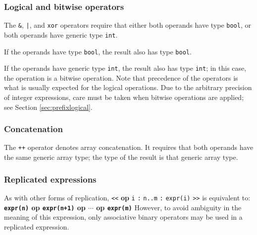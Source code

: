 

\subsubsection{Logical and bitwise operators}\label{sec:logical}

The {\tt{}\&}, \verb'|', and {\tt{}xor} operators require that either both operands
have type {\tt{}bool}, or both operands have generic type {\tt{}int}.

If the operands have type {\tt{}bool}, the result also has type {\tt{}bool}.

If the operands have generic type {\tt{}int}, the result also has
type {\tt{}int}; in this case, the operation is a bitwise operation.
Note that precedence of the operators is what is usually expected for
the logical operations. Due to the arbitrary precision of integer
expressions, care must be taken when bitwise operations are applied;
see Section \ref{sec:prefixlogical}.


\subsubsection{Concatenation}\label{sec:concatenation}

The {\tt{}++} operator denotes array concatenation. It requires that
both operands have the same generic array type; the type of the result
is that generic array type.



\subsubsection{Replicated expressions}\label{sec:repexpr}

As with other forms of replication, {\tt{}<<} {\bf op} {\tt{}i} {\tt{}:} {\tt{}n..m} {\tt{}:} {\tt{}expr(i)} {\tt{}>>}
is equivalent to:
\smallskip
{\bf {\tt{}expr(n)} op {\tt{}expr(n+1)} op $\cdots$ op {\tt{}expr(m)}}
\smallskip
\noindent However, to avoid ambiguity in the meaning of this expression, only associative
binary operators may be used in a replicated expression.


